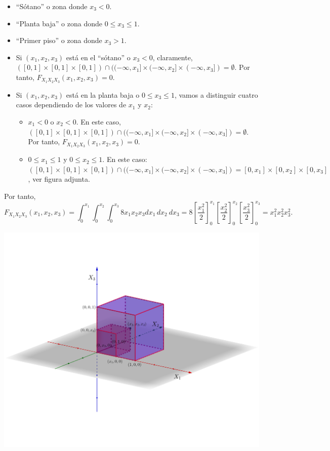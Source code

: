 \documentclass[]{book}
\providecommand{\tightlist}{%
  \setlength{\itemsep}{0pt}\setlength{\parskip}{0pt}}
\begin{document}
\begin{itemize}
\item
  ``Sótano'' o zona donde \(x_3<0\).
\item
  ``Planta baja'' o zona donde \(0\leq x_3\leq 1\).
\item
  ``Primer piso'' o zona donde \(x_3>1\).
\item
  Si \((x_1,x_2,x_3)\) está en el ``sótano'' o \(x_3<0\), claramente, \(([0,1]\times [0,1]\times [0,1])\cap ((-\infty,x_1]\times (-\infty,x_2]\times (-\infty,x_3])=\emptyset\). Por tanto, \(F_{X_1X_2X_3}(x_1,x_2,x_3)=0\).
\item
  Si \((x_1,x_2,x_3)\) está en la planta baja o \(0\leq x_3\leq 1\), vamos a distinguir cuatro casos dependiendo de los valores de \(x_1\) y \(x_2\):

  \begin{itemize}
  \tightlist
  \item
    \(x_1 <0\) o \(x_2 <0\). En este caso, \(([0,1]\times [0,1]\times [0,1])\cap ((-\infty,x_1]\times (-\infty,x_2]\times (-\infty,x_3])=\emptyset\). Por tanto, \(F_{X_1X_2X_3}(x_1,x_2,x_3)=0\).
  \item
    \(0\leq x_1\leq 1\) y \(0\leq x_2\leq 1\). En este caso: \(([0,1]\times [0,1]\times [0,1])\cap ((-\infty,x_1]\times (-\infty,x_2]\times (-\infty,x_3])=[0,x_1]\times [0,x_2]\times [0,x_3]\), ver figura adjunta.
  \end{itemize}
\end{itemize}

Por tanto,
\[
F_{X_1X_2X_3}(x_1,x_2,x_3)=\int_{0}^{x_1}\int_{0}^{x_2}\int_{0}^{x_3} 8 x_1 x_2 x_3 dx_1\, dx_2\ dx_3 = 
8\left[\frac{x_1^2}{2}\right]_0^{x_1}\left[\frac{x_2^2}{2}\right]_0^{x_2}\left[\frac{x_3^2}{2}\right]_0^{x_3} = x_1^2 x_2^2 x_3^2.
\]

\includegraphics{Images/Fx1x2x3bajos.png}
\end{document}
